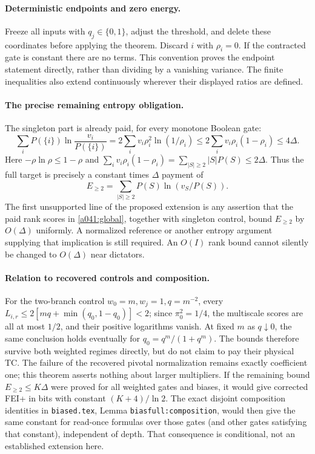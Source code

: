 \paragraph{Deterministic endpoints and zero energy.}
Freeze all inputs with $q_j\in\{0,1\}$, adjust the threshold, and
delete these coordinates before applying the theorem. Discard $i$ with
$\rho_i=0$. If the contracted gate is constant there are no terms.
This convention proves the endpoint statement directly, rather than
dividing by a vanishing variance. The finite inequalities also extend
continuously wherever their displayed ratios are defined.

\paragraph{The precise remaining entropy obligation.}
The singleton part is already paid, for every monotone Boolean gate:
\[
 \sum_iP(\{i\})\ln\frac{v_i}{P(\{i\})}
 =2\sum_iv_i\rho_i^2\ln(1/\rho_i)
 \le2\sum_iv_i\rho_i(1-\rho_i)\le4\Delta.
\]
Here $-\rho\ln\rho\le1-\rho$ and
$\sum_i v_i\rho_i(1-\rho_i)=\sum_{|S|\ge2}|S|P(S)\le2\Delta$.
Thus the full target is precisely a constant times $\Delta$ payment of
\[
 E_{\ge2}=\sum_{|S|\ge2}P(S)\ln(v_S/P(S)).
\]
The first unsupported line of the proposed extension is any assertion
that the paid rank scores in \eqref{a041:global}, together with
singleton control, bound $E_{\ge2}$ by $O(\Delta)$ uniformly. A
normalized reference or another entropy argument supplying that
implication is still required. An $O(I)$ rank bound cannot silently
be changed to $O(\Delta)$ near dictators.

\paragraph{Relation to recovered controls and composition.}
For the two-branch control $w_0=m,w_j=1,q=m^{-2}$, every
$L_{i,r}\le2[mq+\min(q_0,1-q_0)]<2$; since $\pi_0^2=1/4$,
the multiscale scores are all at most $1/2$, and their positive
logarithms vanish. At fixed $m$ as $q\downarrow0$, the same conclusion
holds eventually for $q_0=q^m/(1+q^m)$. The bounds therefore survive
both weighted regimes directly, but do not claim to pay their physical
TC. The failure of the recovered pivotal normalization remains exactly
coefficient one; this theorem asserts nothing about larger multipliers.
If the remaining bound $E_{\ge2}\le K\Delta$ were proved for all
weighted gates and biases, it would give corrected FEI+ in bits with
constant $(K+4)/\ln2$. The exact disjoint composition identities in
\texttt{biased.tex}, Lemma \texttt{biasfull:composition}, would then
give the same constant for read-once formulas over those gates (and
other gates satisfying that constant), independent of depth. That
consequence is conditional, not an established extension here.
